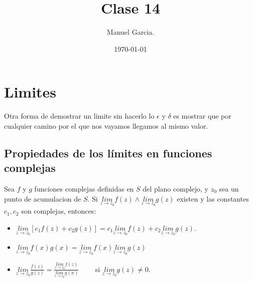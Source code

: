 \documentclass{article}
\title{Clase 14 }
\author{Manuel Garcia.}
\date{\today}
\begin{document}
\maketitle

\section{Limites }
Otra forma de demostrar un limite sin hacerlo lo $ \epsilon $ y $ \delta $ es mostrar que por cualquier camino por el que nos vayamos llegamos al mismo valor.

\subsection{Propiedades de los límites en funciones complejas}
Sea $ f  $ y $ g  $ funciones complejas definidas en $ S  $ del plano complejo, y $ z_0  $ sea un punto de acumulacion de $ S  $. Si $ \underset{z \rightarrow z_0 }{lim }f(z)  \land \underset{z \rightarrow z_0 }{lim }g(z)   $ existen y las constantes $ c_1,c_2  $ son complejas, entonces: 
\begin{itemize}
  \item $ \underset{z \rightarrow z_0 }{lim }\left[c_1 f(z) + c_2 g(z) \right] = c_1 \underset{z \rightarrow z_0 }{lim }f(z) + c_2 \underset{z \rightarrow z_0 }{lim }g(z)  $.
  \item $ \underset{z  \rightarrow z_0 }{lim}f(x)g(x) = \underset{z \rightarrow z_0 }{lim}f(x) \underset{z  \rightarrow z_0 }{lim}g(z)  $
  \item $ \underset{z  \rightarrow z_0 }{lim}\frac{f(z) }{g(z) } = \displaystyle\frac{\underset{z  \rightarrow z_0 }{lim}f(z) }{\underset{z  \rightarrow z_0 }{lim}g(x)} \qquad$ si $ \underset{z  \rightarrow z_0 }{lim}g(z) \neq 0  $.
\end{itemize}
\end{document}
